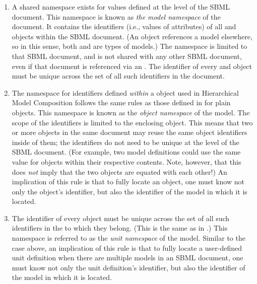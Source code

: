 \begin{enumerate}

\item A shared namespace exists for  values defined at the
  level of the SBML document.  This namespace is known as \emph{the
    model namespace} of the document.  It contains the identifiers
  (i.e., values of  attributes) of all \Model and
  \ExternalModelDefinition objects within the SBML document.  (An
  \ExternalModelDefinition object references a model elsewhere, so in
  this sense, both \Model and \ExternalModelDefinition are types of
  models.)  The namespace is limited to that SBML document, and is not
  shared with any other SBML document, even if that document is
  referenced via an \ExternalModelDefinition.  The identifier of every
  \Model and \ExternalModelDefinition object must be unique across the
  set of all such identifiers in the document.

\item The namespace for  identifiers defined \emph{within}
  a \Model object used in Hierarchical Model Composition follows the
  same rules as those defined in \sbmlthreecore for plain \Model
  objects.  This namespace is known as the \emph{object namespace} of
  the model.  The scope of the identifiers is limited to the enclosing
  \Model object.  This means that two or more \Model objects in the same
  document may reuse the same object identifiers inside of them; the
  identifiers do not need to be unique at the level of the SBML
  document.  (For example, two model definitions could use the same
   value for \Parameter objects within their respective
  contents.  Note, however, that this does \emph{not} imply that the two
  objects are equated with each other!)  An implication of this rule is
  that to fully locate an object, one must know not only the object's
  identifier, but also the identifier of the model in which it is
  located.

\item The identifier of every \UnitDefinition object must be unique
  across the set of all such identifiers in the \Model to which they
  belong.  (This is the same as in \sbmlthreecore.)  This namespace is
  referred to as the \emph{unit namespace} of the model.  Similar to the
  case above, an implication of this rule is that to fully locate a
  user-defined unit definition when there are multiple models in an SBML
  document, one must know not only the unit definition's identifier, but
  also the identifier of the model in which it is located.


\end{enumerate}
